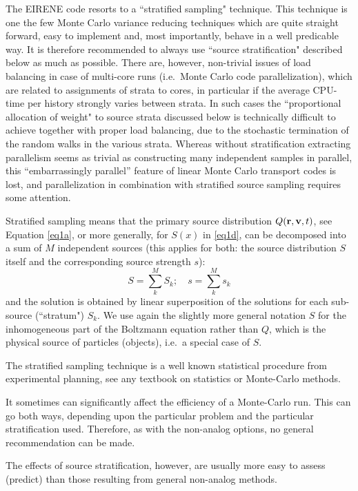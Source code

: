 The EIRENE code resorts to a ``stratified sampling" technique.
This technique is one the few Monte Carlo variance reducing techniques which
are quite straight forward, easy to implement and, most importantly, behave in
a well predicable way.
It is therefore recommended to always use ``source stratification" described
below as much as possible.
There are, however, non-trivial issues of load balancing in case of multi-core
runs (i.e.\ Monte Carlo code parallelization), which are related to assignments
of strata to cores, in particular if the average CPU-time per history strongly
varies between strata.
In such cases the ``proportional allocation of weight" to source strata
discussed below is technically difficult to achieve together with proper load
balancing, due to the stochastic termination of the random walks in the various
strata.
Whereas without stratification extracting parallelism seems as trivial as
constructing many independent samples in parallel, this ``embarrassingly
parallel'' feature of linear Monte Carlo transport codes is lost, and
parallelization in combination with stratified source sampling requires some
attention.

Stratified sampling means that the primary source distribution $Q(\mathbf{r},\mathbf{v},t)$,
see Equation \cref{eq1a}, or more generally, for $S(x)$ in \cref{eq1d}, can be
decomposed into a sum of $M$ independent sources (this applies for both: the
source distribution $S$ itself and the corresponding source strength $s$):
\begin{equation}
  \label{sss}
  S = \sum_k^{M} S_k ; \quad s=\sum_k^{M} s_k
\end{equation}
and the solution is
obtained by linear superposition of the solutions for each sub-source
(``stratum") $S_k$.
We use again the slightly more general notation $S$ for the inhomogeneous part
of the Boltzmann equation rather than $Q$, which is the physical source of
particles (objects), i.e.\ a special case of $S$.

The stratified sampling technique is a well known statistical procedure from
experimental planning, see any textbook on statistics or Monte-Carlo methods.

It sometimes can significantly affect the efficiency of a Monte-Carlo run.
This can go both ways, depending upon the particular problem and the particular
stratification used.
Therefore, as with the non-analog options, no general recommendation can be
made.

The effects of source stratification, however, are usually more easy to assess
(predict) than those resulting from general non-analog methods.

